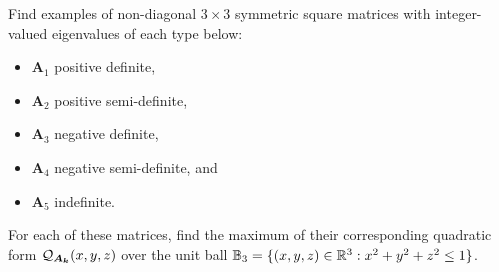\begin{problem}[Basic]
Find examples of non-diagonal $3\times 3$ symmetric square matrices with integer-valued eigenvalues of each type below: 
\begin{itemize}
\item $\boldsymbol{A}_1$ positive definite, 
\item $\boldsymbol{A}_2$ positive semi-definite, 
\item $\boldsymbol{A}_3$ negative definite, 
\item $\boldsymbol{A}_4$ negative semi-definite, and 
\item $\boldsymbol{A}_5$ indefinite. 
\end{itemize}
For each of these matrices, find the maximum of their corresponding quadratic form $\mathcal{Q}_{\boldsymbol{A_k}}(x,y,z)$ over the unit ball $\mathbb{B}_3 = \{ (x,y,z) \in \mathbb{R}^3: x^2+y^2+z^2 \leq 1 \}$.
\end{problem}

